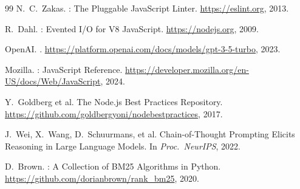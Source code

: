 \documentclass[runningheads]{llncs}
\begin{document}
\begin{thebibliography}{99}
  N.\ C.\ Zakas.
  : The Pluggable JavaScript Linter.
  \newblock \url{https://eslint.org}, 2013.

  R.\ Dahl.
  : Evented I/O for V8 JavaScript.
  \newblock \url{https://nodejs.org}, 2009.

  OpenAI.
  .
  \newblock \url{https://platform.openai.com/docs/models/gpt-3-5-turbo}, 2023.

  Mozilla.
  : JavaScript Reference.
  \newblock \url{https://developer.mozilla.org/en-US/docs/Web/JavaScript}, 2024.

  Y.\ Goldberg et al.
  \newblock The {Node.js} Best Practices Repository.
  \newblock \url{https://github.com/goldbergyoni/nodebestpractices}, 2017.

  J.\ Wei, X.\ Wang, D.\ Schuurmans, et al.
  \newblock Chain-of-Thought Prompting Elicits Reasoning in Large Language Models.
  \newblock In \emph{Proc.\ NeurIPS}, 2022.

  D.\ Brown.
  : A Collection of BM25 Algorithms in Python.
  \newblock \url{https://github.com/dorianbrown/rank_bm25}, 2020.

\end{thebibliography}
\end{document}
